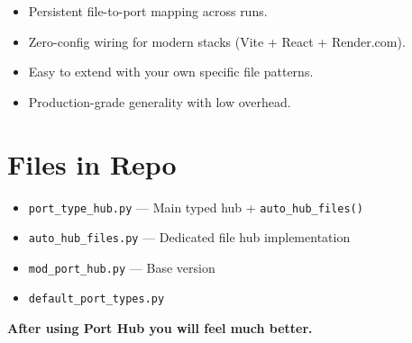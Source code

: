 \documentclass[11pt,a4paper]{article}
\begin{document}
\begin{itemize}
    \item Persistent file-to-port mapping across runs.
    \item Zero-config wiring for modern stacks (Vite + React + Render.com).
    \item Easy to extend with your own specific file patterns.
    \item Production-grade generality with low overhead.
\end{itemize}

\section{Files in Repo}
\begin{itemize}
    \item \texttt{port\_type\_hub.py} — Main typed hub + \texttt{auto\_hub\_files()}
    \item \texttt{auto\_hub\_files.py} — Dedicated file hub implementation
    \item \texttt{mod\_port\_hub.py} — Base version
    \item \texttt{default\_port\_types.py}
\end{itemize}

\bigskip
\textbf{After using Port Hub you will feel much better.}
\end{document}
